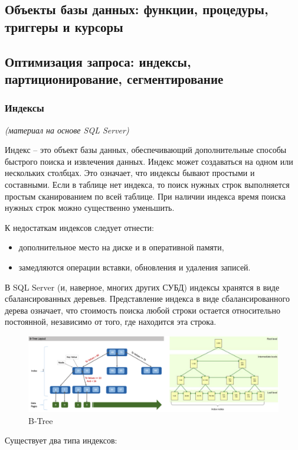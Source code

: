 \subsection{Объекты базы данных: функции, процедуры, триггеры и курсоры}


\subsection{Оптимизация запроса: индексы, партиционирование, сегментирование}

\subsubsection{Индексы}
\textit{(материал на основе SQL Server)}

Индекс – это объект базы данных, обеспечивающий дополнительные способы быстрого поиска и извлечения данных. Индекс может создаваться на одном или нескольких столбцах. 
Это означает, что индексы бывают простыми и составными. Если в таблице нет индекса, то поиск нужных строк выполняется простым сканированием по всей таблице. При наличии индекса время поиска нужных строк можно существенно уменьшить. 

К недостаткам индексов следует отнести:
\begin{itemize}
	\item дополнительное место на диске и в оперативной памяти, 
	\item замедляются операции вставки, обновления и удаления записей. 
\end{itemize}

В SQL Server (и, наверное, многих других СУБД) индексы хранятся в виде сбалансированных деревьев. Представление индекса в виде сбалансированного дерева означает, что стоимость поиска любой строки остается относительно постоянной, независимо от того, где находится эта строка. 

\begin{figure}[ht!]
	\centering
 	\includegraphics[width=18cm, keepaspectratio]{assets/index.png}
	\caption{B-Tree} 
\end{figure}
\FloatBarrier
Существует два типа индексов: 

